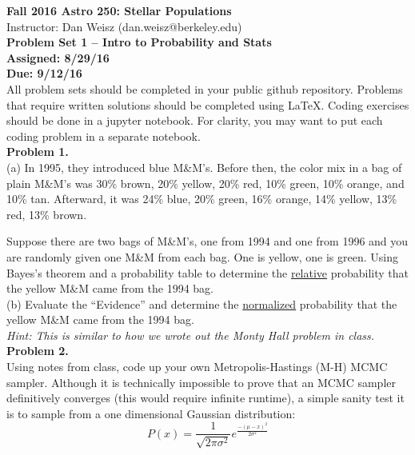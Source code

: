 \documentclass{article}
\begin{document}
\noindent \textbf{\large{Fall 2016 Astro 250: Stellar Populations}} \\
\noindent Instructor: Dan Weisz (dan.weisz@berkeley.edu) \\
\textbf{\large{Problem Set 1 -- Intro to Probability and Stats}} \\
\textbf{{Assigned: 8/29/16}} \\
\textbf{{Due: 9/12/16}} \\

\noindent All problem sets should be completed in your public github repository.  Problems that require written solutions should be completed using LaTeX.  Coding exercises should be done in a jupyter notebook. For clarity, you may want to put each coding problem in a separate notebook.\\


\noindent \textbf{Problem 1.} \\ 

(a) In 1995, they introduced blue M\&M's.  Before then, the color mix in a bag of plain M\&M's was 30\% brown, 20\% yellow, 20\% red, 10\% green, 10\% orange, and 10\% tan.  Afterward, it was 24\% blue, 20\% green, 16\% orange, 14\% yellow, 13\% red, 13\% brown.

Suppose there are two bags of M\&M's, one from 1994 and one from 1996 and you are randomly given one M\&M from each bag.  One is yellow, one is green.  Using Bayes's theorem and a probability table to determine the \underline{relative} probability that the yellow M\&M came from the 1994 bag. \\

(b) Evaluate the ``Evidence'' and determine the \underline{normalized} probability that the yellow M\&M came from the 1994 bag. \\

\noindent \textit{Hint: This is similar to how we wrote out the Monty Hall problem in class.} \\



\noindent \textbf{Problem 2.} \\ 

Using notes from class, code up your own Metropolis-Hastings (M-H) MCMC sampler.  Although it is technically impossible to prove that an MCMC sampler definitively converges (this would require infinite runtime), a simple sanity test it is to sample from a one dimensional Gaussian distribution:
\begin{equation}
P(x)= \frac{1}{\sqrt{2\pi\sigma^2}} e^\frac{-(\mu-x)^2}{2\sigma^2}
\end{equation}
\end{document}
